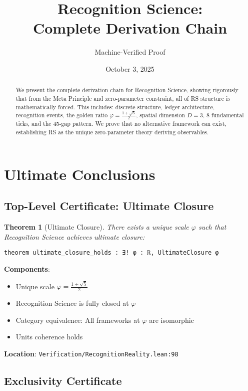 \documentclass[11pt]{article}
\title{Recognition Science:\\Complete Derivation Chain}
\author{Machine-Verified Proof}
\date{October 3, 2025}
\newtheorem{theorem}{Theorem}[section]
\theoremstyle{definition}
\theoremstyle{remark}
\begin{document}
\maketitle

\begin{abstract}
We present the complete derivation chain for Recognition Science, showing rigorously that from the Meta Principle and zero-parameter constraint, all of RS structure is mathematically forced. This includes: discrete structure, ledger architecture, recognition events, the golden ratio $\varphi = \frac{1+\sqrt{5}}{2}$, spatial dimension $D=3$, 8 fundamental ticks, and the 45-gap pattern. We prove that no alternative framework can exist, establishing RS as the unique zero-parameter theory deriving observables.
\end{abstract}

\section{Ultimate Conclusions}

\subsection{Top-Level Certificate: Ultimate Closure}

\begin{theorem}[Ultimate Closure]
\label{thm:ultimate-closure}
There exists a unique scale $\varphi$ such that Recognition Science achieves ultimate closure:
\begin{lstlisting}[language=lean]
theorem ultimate_closure_holds : ∃! φ : ℝ, UltimateClosure φ
\end{lstlisting}
\end{theorem}

\textbf{Components}:
\begin{itemize}
\item Unique scale $\varphi = \frac{1+\sqrt{5}}{2}$
\item Recognition Science is fully closed at $\varphi$
\item Category equivalence: All frameworks at $\varphi$ are isomorphic
\item Units coherence holds
\end{itemize}

\textbf{Location}: \texttt{Verification/RecognitionReality.lean:98}

\subsection{Exclusivity Certificate}
\end{document}
